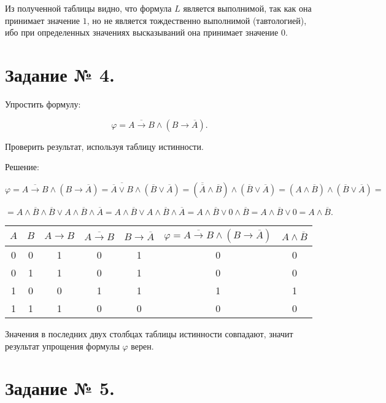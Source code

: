 \documentclass[fleqn]{article}
\begin{document}
Из полученной таблицы видно, что формула $L$ является выполнимой, так как она принимает значение $1$, но не является тождественно выполнимой (тавтологией), ибо при определенных значениях высказываний она принимает значение $0$.

\section*{Задание № 4.}

Упростить формулу:

$$\varphi=\overline{A\to B}\wedge\left(B\to\overline{A}\right).$$

Проверить результат, используя таблицу истинности.

\begin{center}Решение:\end{center}

$$\varphi=\overline{A\to B}\wedge\left(B\to\overline{A}\right)=\overline{\overline{A}\vee B}\wedge\left(\overline{B}\vee\overline{A}\right)=\left(\overline{\overline{A}}\wedge\overline{B}\right)\wedge\left(\overline{B}\vee\overline{A}\right)=\left(A\wedge\overline{B}\right)\wedge\left(\overline{B}\vee\overline{A}\right)=$$

$$=A\wedge\overline{B}\wedge\overline{B}\vee A\wedge\overline{B}\wedge\overline{A}=A\wedge\overline{B}\vee A\wedge\overline{B}\wedge\overline{A}=A\wedge\overline{B}\vee0\wedge\overline{B}=A\wedge\overline{B}\vee0=A\wedge\overline{B}.$$


\medskip
\bgroup
\def\arraystretch{1.5}
\setlength{}
\begin{tabular}{|c|c|c|c|c|c|c|}
\hline
$A$ & $B$ & $A\to B$ & $\overline{A\to B}$ & $B\to\overline{A}$ & $\varphi=\overline{A\to B}\wedge\left(B\to\overline{A}\right)$ & $A\wedge\overline{B}$ \\
\hline
0 & 0 & 1 & 0 & 1 & 0 & 0 \\
\hline
0 & 1 & 1 & 0 & 1 & 0 & 0 \\
\hline
1 & 0 & 0 & 1 & 1 & 1 & 1 \\
\hline
1 & 1 & 1 & 0 & 0 & 0 & 0 \\
\hline
\end{tabular}
\egroup
\medskip

Значения в последних двух столбцах таблицы истинности совпадают, значит результат упрощения формулы $\varphi$ верен.

\section*{Задание № 5.}
\end{document}
